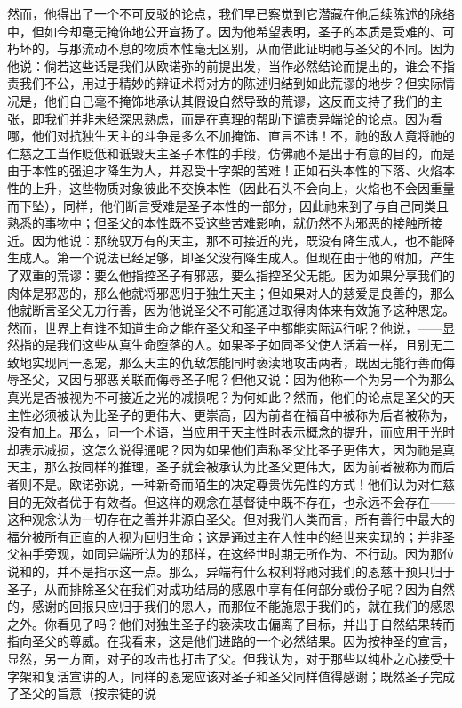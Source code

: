然而，他得出了一个不可反驳的论点，我们早已察觉到它潜藏在他后续陈述的脉络中，但如今却毫无掩饰地公开宣扬了。因为他希望表明，圣子的本质是受难的、可朽坏的，与那流动不息的物质本性毫无区别，从而借此证明祂与圣父的不同。因为他说：倘若这些话是我们从欧诺弥的前提出发，当作必然结论而提出的，谁会不指责我们不公，用过于精妙的辩证术将对方的陈述归结到如此荒谬的地步？但实际情况是，他们自己毫不掩饰地承认其假设自然导致的荒谬，这反而支持了我们的主张，即我们并非未经深思熟虑，而是在真理的帮助下谴责异端论的论点。因为看哪，他们对抗独生天主的斗争是多么不加掩饰、直言不讳！不，祂的敌人竟将祂的仁慈之工当作贬低和诋毁天主圣子本性的手段，仿佛祂不是出于有意的目的，而是由于本性的强迫才降生为人，并忍受十字架的苦难！正如石头本性的下落、火焰本性的上升，这些物质对象彼此不交换本性（因此石头不会向上，火焰也不会因重量而下坠），同样，他们断言受难是圣子本性的一部分，因此祂来到了与自己同类且熟悉的事物中；但圣父的本性既不受这些苦难影响，就仍然不为邪恶的接触所接近。因为他说：那统驭万有的天主，那不可接近的光，既没有降生成人，也不能降生成人。第一个说法已经足够，即圣父没有降生成人。但现在由于他的附加，产生了双重的荒谬：要么他指控圣子有邪恶，要么指控圣父无能。因为如果分享我们的肉体是邪恶的，那么他就将邪恶归于独生天主；但如果对人的慈爱是良善的，那么他就断言圣父无力行善，因为他说圣父不可能通过取得肉体来有效施予这种恩宠。然而，世界上有谁不知道生命之能在圣父和圣子中都能实际运行呢？他说，——显然指的是我们这些从真生命堕落的人。如果圣子如同圣父使人活着一样，且别无二致地实现同一恩宠，那么天主的仇敌怎能同时亵渎地攻击两者，既因无能行善而侮辱圣父，又因与邪恶关联而侮辱圣子呢？但他又说：因为他称一个为另一个为那么真光是否被视为不可接近之光的减损呢？为何如此？然而，他们的论点是圣父的天主性必须被认为比圣子的更伟大、更崇高，因为前者在福音中被称为后者被称为，没有加上。那么，同一个术语，当应用于天主性时表示概念的提升，而应用于光时却表示减损，这怎么说得通呢？因为如果他们声称圣父比圣子更伟大，因为祂是真天主，那么按同样的推理，圣子就会被承认为比圣父更伟大，因为前者被称为而后者则不是。欧诺弥说，一种新奇而陌生的决定尊贵优先性的方式！他们认为对仁慈目的无效者优于有效者。但这样的观念在基督徒中既不存在，也永远不会存在——这种观念认为一切存在之善并非源自圣父。但对我们人类而言，所有善行中最大的福分被所有正直的人视为回归生命；这是通过主在人性中的经世来实现的；并非圣父袖手旁观，如同异端所认为的那样，在这经世时期无所作为、不行动。因为那位说和的，并不是指示这一点。那么，异端有什么权利将祂对我们的恩慈干预只归于圣子，从而排除圣父在我们对成功结局的感恩中享有任何部分或份子呢？因为自然的，感谢的回报只应归于我们的恩人，而那位不能施恩于我们的，就在我们的感恩之外。你看见了吗？他们对独生圣子的亵渎攻击偏离了目标，并出于自然结果转而指向圣父的尊威。在我看来，这是他们进路的一个必然结果。因为按神圣的宣言，显然，另一方面，对子的攻击也打击了父。但我认为，对于那些以纯朴之心接受十字架和复活宣讲的人，同样的恩宠应该对圣子和圣父同样值得感谢；既然圣子完成了圣父的旨意（按宗徒的说